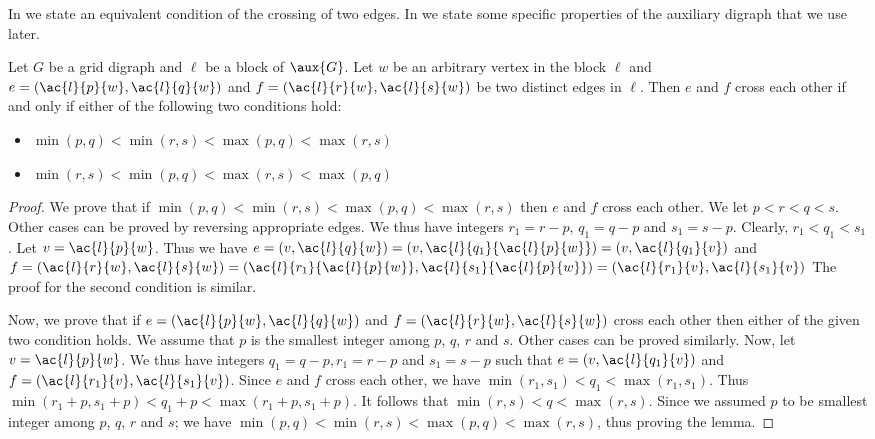 \documentclass{toc}
\begin{document}
In  we state an equivalent condition of the crossing of two edges. In   we state some specific properties of the auxiliary 
digraph %
that we use later.


\begin{lemma}
\label{lem:cross}
Let $G$ be a grid 
digraph %
and $\ell$ be a block of $\aux{G}$. Let $w$ be an arbitrary vertex in the block $\ell$ and $e = (\ac{l}{p}{w}, \ac{l}{q}{w})$ and $f = (\ac{l}{r}{w}, \ac{l}{s}{w})$ be two distinct edges in $\ell$. Then $e$ and $f$ cross each other if and only if either of the following two conditions hold:
\begin{itemize}
\item $\min(p, q) < \min(r, s) < \max(p, q) < \max(r,s)$
\item $\min(r, s) < \min(p, q) < \max(r, s) < \max(p,q)$
\end{itemize}
\end{lemma}

\begin{proof}
We prove that if $\min(p, q) < \min(r, s) < \max(p, q) < \max(r,s)$ then $e$ and $f$ cross each other. We let $p < r < q < s$. Other cases can be proved by reversing appropriate edges. We thus have integers $r_1 = r - p$, $q_1 = q - p$ and $s_1 = s - p$. Clearly, $r_1 < q_1 < s_1$. Let $v = \ac{l}{p}{w}$. Thus we have $e = (v, \ac{l}{q}{w}) = (v, \ac{l}{q_1}{\ac{l}{p}{w}}) = (v, \ac{l}{q_1}{v})$ and $f = (\ac{l}{r}{w}, \ac{l}{s}{w}) = (\ac{l}{r_1}{\ac{l}{p}{w}}, \ac{l}{s_1}{\ac{l}{p}{w}}) = (\ac{l}{r_1}{v}, \ac{l}{s_1}{v})$
The proof for the second condition is similar.

Now, we prove that if $e = (\ac{l}{p}{w}, \ac{l}{q}{w})$ and $f = (\ac{l}{r}{w}, \ac{l}{s}{w})$ cross each other then either of the given two condition holds. We assume that $p$ is the smallest integer among $p$, $q$, $r$ and $s$. Other cases can be proved similarly. Now, let $v = \ac{l}{p}{w}$. We thus have integers $q_1 = q-p, r_1 = r-p$ and $s_1 = s-p$ such that $e = (v, \ac{l}{q_1}{v})$ and $f = (\ac{l}{r_1}{v}, \ac{l}{s_1}{v})$. Since $e$ and $f$ cross each other, we have $\min(r_1, s_1) < q_1 < \max(r_1, s_1)$. Thus $\min(r_1+p, s_1+p) < q_1+p < \max(r_1+p, s_1+p)$. It follows that $\min(r, s) < q < \max(r,s)$. Since we assumed $p$ to be smallest integer among $p$, $q$, $r$ and $s$; we have $\min(p, q) < \min(r, s) < \max(p, q) < \max(r,s)$, thus proving the lemma.
\end{proof}
\end{document}
